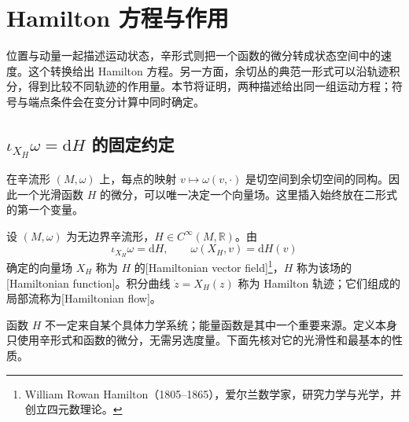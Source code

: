 
% 
% 

\section{Hamilton 方程与作用}
\label{g4:sec:0901}

位置与动量一起描述运动状态，辛形式则把一个函数的微分转成状态空间中的速度。这个转换给出 Hamilton 方程。另一方面，余切丛的典范一形式可以沿轨迹积分，得到比较不同轨迹的作用量。本节将证明，两种描述给出同一组运动方程；符号与端点条件会在变分计算中同时确定。

\subsection{\texorpdfstring{\(\iota_{X_H}\omega=\mathrm{d}H\) 的固定约定}{\GeometryPdfIota{}\_XH \GeometryPdfSmallOmega{}=dH 的固定约定}}
\label{g4:subsec:0901:01}

在辛流形 \((M,\omega)\) 上，每点的映射 \(v\mapsto\omega(v,\cdot)\) 是切空间到余切空间的同构。因此一个光滑函数 \(H\) 的微分，可以唯一决定一个向量场。这里插入始终放在二形式的第一个变量。

\begin{definition}\label{g4:def:0901:hamiltonian-field}
	设 \((M,\omega)\) 为无边界辛流形，\(H\in C^\infty(M,\mathbb R)\)。由
	\begin{equation}\label{g4:eq:0901:hamiltonian-convention}
		\iota_{X_H}\omega=\mathrm{d}H,
		\qquad \omega(X_H,v)=\mathrm{d}H(v)
	\end{equation}
	确定的向量场 \(X_H\) 称为 \(H\) 的[Hamiltonian vector field]\footnote{William Rowan Hamilton（1805--1865），爱尔兰数学家，研究力学与光学，并创立四元数理论。}，\(H\) 称为该场的[Hamiltonian function]。积分曲线 \(\dot z=X_H(z)\) 称为 Hamilton 轨迹；它们组成的局部流称为[Hamiltonian flow]。
\end{definition}

函数 \(H\) 不一定来自某个具体力学系统；能量函数是其中一个重要来源。定义本身只使用辛形式和函数的微分，无需另选度量。下面先核对它的光滑性和最基本的性质。

